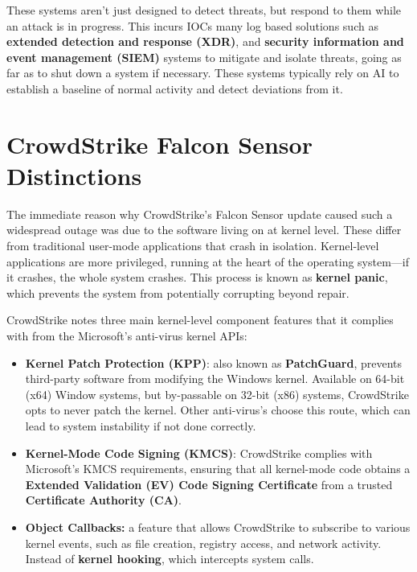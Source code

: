 These systems aren't just designed to detect threats, but respond to them while an attack is in progress. This incurs IOCs many log based solutions such as \textbf{extended detection and response (XDR)}, and \textbf{security information and event management (SIEM)} systems to mitigate and isolate threats, going as far as to shut down a system if necessary. These systems typically rely on AI to establish a baseline of normal activity and detect deviations from it. \cite{microsoft_ioc}

\section{CrowdStrike Falcon Sensor Distinctions}

The immediate reason why CrowdStrike's Falcon Sensor update caused such a widespread outage was due to
the software living on at kernel level. These differ from traditional user-mode applications that crash in isolation.
Kernel-level applications are more privileged, running at the heart of the operating system---if it crashes, the whole system crashes. 
This process is known as \textbf{kernel panic}, which prevents the system from potentially corrupting beyond repair. \cite{awati_kernel_panic}

CrowdStrike notes three main kernel-level component features that it complies with from the Microsoft's anti-virus kernel APIs: \cite{ionescu_kernel_access_2024}

\begin{itemize}
    \item \textbf{Kernel Patch Protection (KPP)}: also known as \textbf{PatchGuard}, prevents third-party software from modifying the Windows kernel.
    Available on 64-bit (x64) Window systems, but by-passable on 32-bit (x86) systems, CrowdStrike opts to never patch the kernel. Other anti-virus's choose this route, which can lead to system instability if not done correctly. \cite{wikipedia_kpp}
    \item \textbf{Kernel-Mode Code Signing (KMCS)}: CrowdStrike complies with Microsoft's KMCS requirements, ensuring that all kernel-mode code obtains a \textbf{Extended Validation (EV) Code Signing Certificate} from a trusted \textbf{Certificate Authority (CA)}. \cite{microsoft_kmcs}\cite{reasonlabs_kernel_hooking}
    \item \textbf{Object Callbacks:} a feature that allows CrowdStrike to subscribe to various kernel events, such as file creation, registry access, and network activity.
    Instead of \textbf{kernel hooking}, which intercepts system calls. \cite{microsoft_obregistercallbacks}
\end{itemize}

